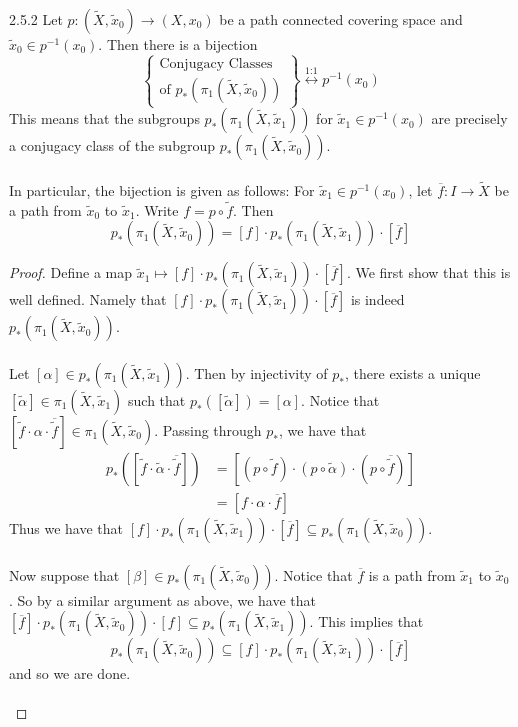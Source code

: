 \documentclass[a4paper]{article}
\begin{document}
\begin{prp}{}{2.5.2} Let $p:(\tilde{X},\tilde{x}_0)\to (X,x_0)$ be a path connected covering space and $\tilde{x}_0\in p^{-1}(x_0)$. Then there is a bijection $$\left\{\substack{\text{Conjugacy Classes}\\\text{of }p_\ast(\pi_1(\tilde{X},\tilde{x}_0))}\right\}\overset{\text{1:1}}{\longleftrightarrow} p^{-1}(x_0)$$ This means that the subgroups $p_\ast(\pi_1(\tilde{X},\tilde{x}_1))$ for $\tilde{x}_1\in p^{-1}(x_0)$ are precisely a conjugacy class of the subgroup $p_\ast(\pi_1(\tilde{X},\tilde{x}_0))$. \\~\\

In particular, the bijection is given as follows: For $\tilde{x}_1\in p^{-1}(x_0)$, let $\overline{f}:I\to\tilde{X}$ be a path from $\tilde{x}_0$ to $\tilde{x}_1$. Write $f=p\circ\tilde{f}$. Then $$p_\ast(\pi_1(\tilde{X},\tilde{x}_0))=[f]\cdot p_\ast(\pi_1(\tilde{X},\tilde{x}_1))\cdot[\overline{f}]$$ \tcbline
\begin{proof}
Define a map $\tilde{x}_1\mapsto[f]\cdot p_\ast(\pi_1(\tilde{X},\tilde{x}_1))\cdot[\overline{f}]$. We first show that this is well defined. Namely that $[f]\cdot p_\ast(\pi_1(\tilde{X},\tilde{x}_1))\cdot[\overline{f}]$ is indeed $p_\ast(\pi_1(\tilde{X},\tilde{x}_0))$. \\~\\

Let $[\alpha]\in p_\ast(\pi_1(\tilde{X},\tilde{x}_1))$. Then by injectivity of $p_\ast$, there exists a unique $[\tilde{\alpha}]\in\pi_1(\tilde{X},\tilde{x}_1)$ such that $p_\ast([\tilde{\alpha}])=[\alpha]$. Notice that $[\tilde{f}\cdot\alpha\cdot\overline{\tilde{f}}]\in\pi_1(\tilde{X},\tilde{x}_0)$. Passing through $p_\ast$, we have that 
\begin{align*}
p_\ast\left([\tilde{f}\cdot\tilde{\alpha}\cdot\overline{\tilde{f}}]\right)&=[(p\circ\tilde{f})\cdot(p\circ\tilde{\alpha})\cdot(p\circ\overline{\tilde{f}})]\\
&=[f\cdot\alpha\cdot\overline{f}]
\end{align*}
Thus we have that $[f]\cdot p_\ast(\pi_1(\tilde{X},\tilde{x}_1))\cdot[\overline{f}]\subseteq p_\ast(\pi_1(\tilde{X},\tilde{x}_0))$. \\~\\

Now suppose that $[\beta]\in p_\ast(\pi_1(\tilde{X},\tilde{x}_0))$. Notice that $\overline{f}$ is a path from $\tilde{x}_1$ to $\tilde{x}_0$. So by a similar argument as above, we have that $[\overline{f}]\cdot p_\ast(\pi_1(\tilde{X},\tilde{x}_0))\cdot[f]\subseteq p_\ast(\pi_1(\tilde{X},\tilde{x}_1))$. This implies that $$p_\ast(\pi_1(\tilde{X},\tilde{x}_0))\subseteq [f]\cdot p_\ast(\pi_1(\tilde{X},\tilde{x}_1))\cdot[\overline{f}]$$ and so we are done. \\~\\


\end{proof}
\end{prp}
\end{document}
